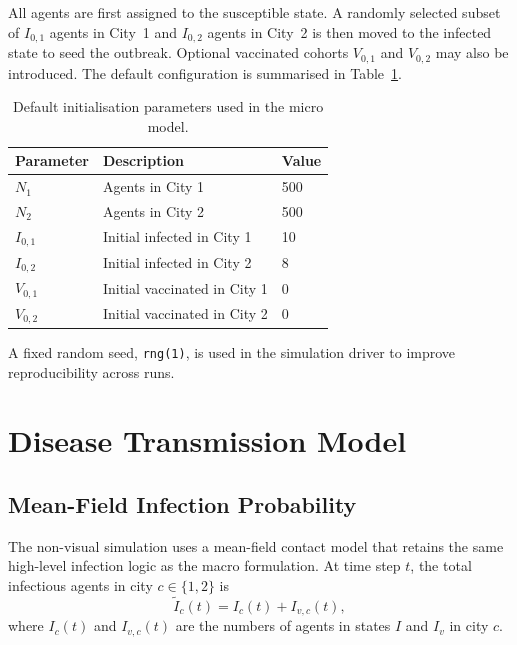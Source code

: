 All agents are first assigned to the susceptible state.
A randomly selected subset of $I_{0,1}$ agents in City~1 and $I_{0,2}$ agents in City~2 is then moved to the infected state to seed the outbreak.
Optional vaccinated cohorts $V_{0,1}$ and $V_{0,2}$ may also be introduced.
The default configuration is summarised in Table~\ref{tab:init_params}.

\begin{table}[ht]
\centering
\caption{Default initialisation parameters used in the micro model.}
\label{tab:init_params}
\begin{tabular}{@{}lll@{}}
\toprule
\textbf{Parameter} & \textbf{Description} & \textbf{Value} \\
\midrule
$N_1$ & Agents in City 1 & 500 \\
$N_2$ & Agents in City 2 & 500 \\
$I_{0,1}$ & Initial infected in City 1 & 10 \\
$I_{0,2}$ & Initial infected in City 2 & 8 \\
$V_{0,1}$ & Initial vaccinated in City 1 & 0 \\
$V_{0,2}$ & Initial vaccinated in City 2 & 0 \\
\bottomrule
\end{tabular}
\end{table}

A fixed random seed, \texttt{rng(1)}, is used in the simulation driver to improve reproducibility across runs.

\section{Disease Transmission Model}
\label{sec:transmission}

\subsection{Mean-Field Infection Probability}
\label{sec:mean_field}

The non-visual simulation uses a mean-field contact model that retains the same high-level infection logic as the macro formulation.
At time step $t$, the total infectious agents in city $c \in \{1, 2\}$ is
\begin{equation}
  \tilde{I}_c(t) = I_c(t) + I_{v,c}(t),
  \label{eq:total_infected}
\end{equation}
where $I_c(t)$ and $I_{v,c}(t)$ are the numbers of agents in states $I$ and $I_v$ in city $c$.

